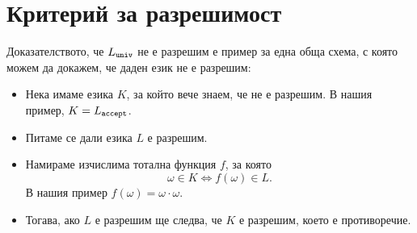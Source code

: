 \section{Критерий за разрешимост}


\begin{framed}
  Доказателството, че $L_{\texttt{univ}}$ не е разрешим е пример за една обща схема, с която можем да докажем, че даден език не е разрешим:
  \begin{itemize}
  \item 
    Нека имаме езика $K$, за който вече знаем, че не е разрешим.
    В нашия пример, $K = L_{\texttt{accept}}$.
  \item
    Питаме се дали езика $L$ е разрешим.
  \item
    Намираме изчислима тотална функция $f$, за която
    \[\omega \in K \iff f(\omega) \in L.\]
    В нашия пример $f(\omega) = \omega \cdot \omega$.
  \item
    Тогава, ако $L$ е разрешим ще следва, че $K$ е разрешим, което е противоречие.
  \end{itemize}
\end{framed}

